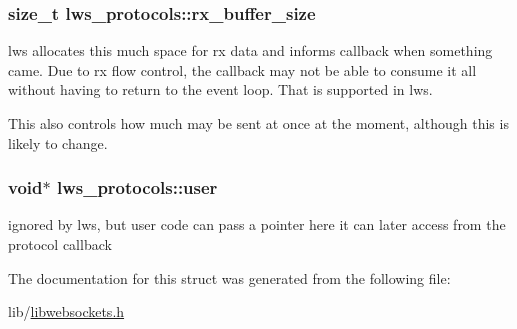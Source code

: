 \subsubsection[{\texorpdfstring{rx\+\_\+buffer\+\_\+size}{rx\_buffer\_size}}]{\setlength{\rightskip}{0pt plus 5cm}size\+\_\+t lws\+\_\+protocols\+::rx\+\_\+buffer\+\_\+size}\hypertarget{structlws__protocols_a0d1d4996d81b2f5e125bcec981e461c5}{}\label{structlws__protocols_a0d1d4996d81b2f5e125bcec981e461c5}
lws allocates this much space for rx data and informs callback when something came. Due to rx flow control, the callback may not be able to consume it all without having to return to the event loop. That is supported in lws.

This also controls how much may be sent at once at the moment, although this is likely to change. 
\subsubsection[{\texorpdfstring{user}{user}}]{\setlength{\rightskip}{0pt plus 5cm}void$\ast$ lws\+\_\+protocols\+::user}\hypertarget{structlws__protocols_a3cbd903ad076736ae934a54cae36580e}{}\label{structlws__protocols_a3cbd903ad076736ae934a54cae36580e}
ignored by lws, but user code can pass a pointer here it can later access from the protocol callback 

The documentation for this struct was generated from the following file\+:\begin{DoxyCompactItemize}
\item 
lib/\hyperlink{libwebsockets_8h}{libwebsockets.\+h}\end{DoxyCompactItemize}
